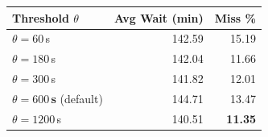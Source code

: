 \begin{tabular}{lrr}
\toprule
\textbf{Threshold $\theta$} & \textbf{Avg Wait (min)} & \textbf{Miss \%} \\
\midrule
$\theta=60$\,s & 142.59 & 15.19 \\
$\theta=180$\,s & 142.04 & 11.66 \\
$\theta=300$\,s & 141.82 & 12.01 \\
\textbf{$\theta=600$\,s} (default) & 144.71 & 13.47 \\
$\theta=1200$\,s & 140.51 & \textbf{11.35} \\
\bottomrule
\end{tabular}

